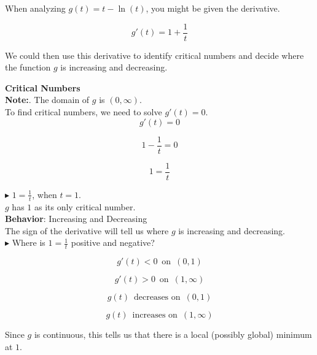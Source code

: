 \documentclass{ximera}
\begin{document}
\begin{example}

When analyzing $g(t) = t - \ln(t)$, you might be given the derivative.


\[
g'(t) = 1 + \frac{1}{t} 
\]


We could then use this derivative to identify critical numbers and decide where the function $g$ is increasing and decreasing.




\textbf{Critical Numbers} \\


\textbf{Note:}. The domain of $g$ is $(0, \infty)$. \\



To find critical numbers, we need to solve $g'(t) = 0$. \\


\[
g'(t) = 0
\]


\[
1 - \frac{1}{t}  = 0
\]


\[
1  = \frac{1}{t}
\]





$\blacktriangleright$ $1  = \frac{1}{t}$, when $t = 1$. \\



$g$ has $1$ as its only critical number. \\




\textbf{Behavior}: Increasing and Decreasing \\



The sign of the derivative will tell us where $g$ is increasing and decreasing. \\


\textbf{\textcolor{blue!55!black}{$\blacktriangleright$}} Where is $1  = \frac{1}{t}$ positive and negative?





\[
g'(t) < 0 \, \text{ on } \, (0, 1)
\]


\[
g'(t) > 0 \, \text{ on } \, (1, \infty)
\]





\[
g(t)  \, \text{ decreases on } \,  (0, 1)
\]


\[
g(t)  \, \text{ increases on } \, (1, \infty)
\]



Since $g$ is continuous, this tells us that there is a local (possibly global) minimum at $1$.


\end{example}
\end{document}
